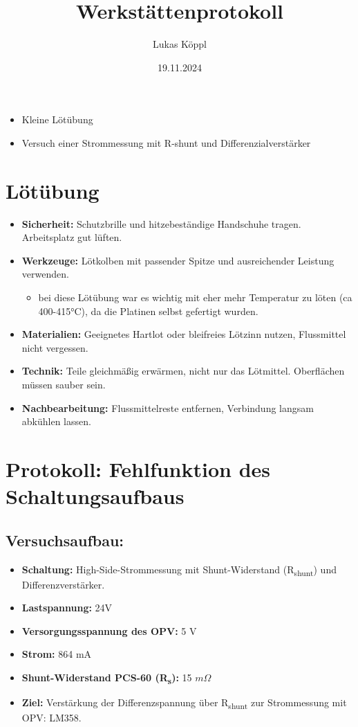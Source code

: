 \documentclass[12pt, a4paper]{article}
\author{Lukas Köppl}
\title{Werkstättenprotokoll}
\date{19.11.2024}
\begin{document}
\maketitle

\begin{itemize}
\item Kleine Lötübung
\item Versuch einer Strommessung mit R-shunt und Differenzialverstärker
\end{itemize}

\tableofcontents

\newpage

\section{Lötübung}
\begin{itemize}
    \item \textbf{Sicherheit:} Schutzbrille und hitzebeständige Handschuhe tragen. Arbeitsplatz gut lüften.
    \item \textbf{Werkzeuge:} Lötkolben mit passender Spitze und ausreichender Leistung verwenden.
    \begin{itemize}
    		\item bei diese Lötübung war es wichtig mit eher mehr Temperatur zu löten (ca 400-415°C), da die Platinen selbst gefertigt wurden.
    \end{itemize}
    \item \textbf{Materialien:} Geeignetes Hartlot oder bleifreies Lötzinn nutzen, Flussmittel nicht vergessen.
    \item \textbf{Technik:} Teile gleichmäßig erwärmen, nicht nur das Lötmittel. Oberflächen müssen sauber sein.
    \item \textbf{Nachbearbeitung:} Flussmittelreste entfernen, Verbindung langsam abkühlen lassen.
    \end{itemize}

\newpage

\section{Protokoll: Fehlfunktion des Schaltungsaufbaus}

\subsection{Versuchsaufbau:}
\begin{itemize}
    \item \textbf{Schaltung:} High-Side-Strommessung mit Shunt-Widerstand (R\textsubscript{shunt}) und Differenzverstärker.
    \item \textbf{Lastspannung:} 24V
    \item \textbf{Versorgungsspannung des OPV:} 5 V
    \item \textbf{Strom:} 864 mA
    \item \textbf{Shunt-Widerstand PCS-60 (R\textsubscript{s}):} 15 \(m\Omega\)  \cite{RS}
    \item \textbf{Ziel:} Verstärkung der Differenzspannung über R\textsubscript{shunt} zur Strommessung mit OPV: LM358.
\end{itemize}
\end{document}
